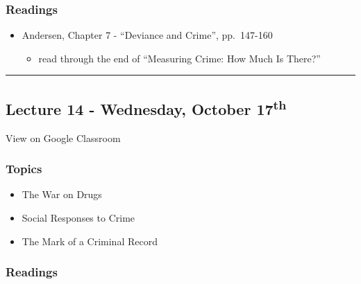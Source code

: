 \documentclass[]{book}
\providecommand{\tightlist}{%
  \setlength{\itemsep}{0pt}\setlength{\parskip}{0pt}}
\theoremstyle{definition}
\theoremstyle{definition}
\theoremstyle{definition}
\theoremstyle{remark}
\begin{document}
\hypertarget{readings-13}{%
\subsubsection*{Readings}\label{readings-13}}

\begin{itemize}
\tightlist
\item
  Andersen, Chapter 7 - ``Deviance and Crime'', pp.~147-160

  \begin{itemize}
  \tightlist
  \item
    read through the end of ``Measuring Crime: How Much Is There?''
  \end{itemize}
\end{itemize}

\begin{center}\rule{0.5\linewidth}{\linethickness}\end{center}

\hypertarget{lecture-14---wednesday-october-17th}{%
\subsection*{\texorpdfstring{Lecture 14 - Wednesday, October
17\textsuperscript{th}}{Lecture 14 - Wednesday, October 17th}}\label{lecture-14---wednesday-october-17th}}

View on Google Classroom

\hypertarget{topics-15}{%
\subsubsection*{Topics}\label{topics-15}}

\begin{itemize}
\tightlist
\item
  The War on Drugs
\item
  Social Responses to Crime
\item
  The Mark of a Criminal Record
\end{itemize}

\hypertarget{readings-14}{%
\subsubsection*{Readings}\label{readings-14}}
\end{document}
